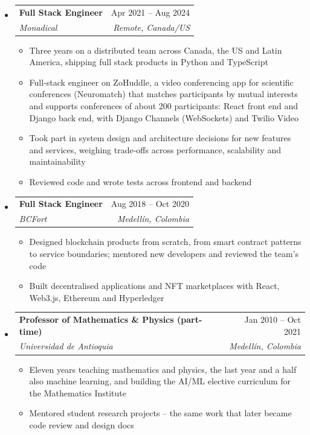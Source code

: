 \documentclass[letterpaper,10pt]{article}
\makeatletter
\newcommand{\resumeSubheading}[4]{
  \vspace{-2pt}
  \item[]
  \begin{tabular*}{\textwidth}{@{\extracolsep{\fill}}l r}
    \textbf{#1} & #2 \\
    \textit{#3} & \textit{#4} \\
  \end{tabular*}
  \vspace{-5pt}
}
\makeatother
\begin{document}
\begin{itemize}[leftmargin=0pt, itemindent=0pt, label={}, itemsep=1pt]
\begin{itemize}[leftmargin=*, itemsep=0pt]
    \item Ran technical design sessions with clients, turning vague business problems into architectures and naming the trade-off behind every technology choice
    \item Code reviewer for a client's development team and architect of their workflow automation platform's database design
\end{itemize}
\resumeSubheading
{Full Stack Engineer}{Apr 2021 -- Aug 2024}
{Monadical}{Remote, Canada/US}
\begin{itemize}[leftmargin=*, itemsep=0pt]
    \item Three years on a distributed team across Canada, the US and Latin America, shipping full stack products in Python and TypeScript
    \item Full-stack engineer on ZoHuddle, a video conferencing app for scientific conferences (Neuromatch) that matches participants by mutual interests and supports conferences of about 200 participants: React front end and Django back end, with Django Channels (WebSockets) and Twilio Video
    \item Took part in system design and architecture decisions for new features and services, weighing trade-offs across performance, scalability and maintainability
    \item Reviewed code and wrote tests across frontend and backend
\end{itemize}
\resumeSubheading
{Full Stack Engineer}{Aug 2018 -- Oct 2020}
{BCFort}{Medell\'in, Colombia}
\begin{itemize}[leftmargin=*, itemsep=0pt]
    \item Designed blockchain products from scratch, from smart contract patterns to service boundaries; mentored new developers and reviewed the team's code
    \item Built decentralised applications and NFT marketplaces with React, Web3.js, Ethereum and Hyperledger
\end{itemize}
\resumeSubheading
{Professor of Mathematics \& Physics (part-time)}{Jan 2010 -- Oct 2021}
{Universidad de Antioquia}{Medell\'in, Colombia}
\begin{itemize}[leftmargin=*, itemsep=0pt]
    \item Eleven years teaching mathematics and physics, the last year and a half also machine learning, and building the AI/ML elective curriculum for the Mathematics Institute
    \item Mentored student research projects -- the same work that later became code review and design docs
\end{itemize}
\end{itemize}
\end{document}
